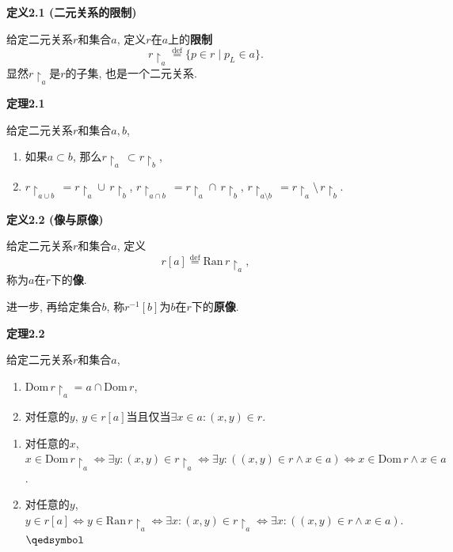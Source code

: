 \hypertarget{sec:定义2.1}{}
\noindent\textbf{定义2.1 (二元关系的限制)}

给定二元关系$r$和集合$a$, 定义$r$在$a$上的\textbf{限制}
\[
    r\!\restriction_a\overset{\mathrm{def}}{=}\{p\in r\mid p_L\in a\}.
\]
显然$r\!\restriction_a$是$r$的子集, 也是一个二元关系.

\vspace{10pt}

\hypertarget{sec:定理2.1}{}
\noindent\textbf{定理2.1}

给定二元关系$r$和集合$a,b$,
\begin{enumerate}
    \item 如果$a\subset b$, 那么$r\!\restriction_a\,\subset r\!\restriction_b$,
    \item $r\!\restriction_{a\cup b}\,=r\!\restriction_a\cup\,r\!\restriction_b$,
    $r\!\restriction_{a\cap b}\,=r\!\restriction_a\cap\,r\!\restriction_b$,
    $r\!\restriction_{a\setminus b}\,=r\!\restriction_a\setminus\,r\!\restriction_b$.
\end{enumerate}

\vspace{10pt}

\hypertarget{sec:定义2.2}{}
\noindent\textbf{定义2.2 (像与原像)}

给定二元关系$r$和集合$a$, 定义
\[
    r[a]\overset{\mathrm{def}}{=}\mathrm{Ran}\,r\!\restriction_a,
\]
称为$a$在$r$下的\textbf{像}.

进一步, 再给定集合$b$, 称$r^{-1}[b]$为$b$在$r$下的\textbf{原像}.

\vspace{10pt}

\hypertarget{sec:定理2.2}{}
\noindent\textbf{定理2.2}

给定二元关系$r$和集合$a$,
\begin{enumerate}
    \item $\mathrm{Dom}\,r\!\restriction_a=a\cap\mathrm{Dom}\,r$,
    \item 对任意的$y$, $y\in r[a]$当且仅当$\exists x\in a:(x,y)\in r$.
\end{enumerate}


\begin{enumerate}
    \item 对任意的$x$, $x\in\mathrm{Dom}\,r\!\restriction_a\iff
    \exists y:(x,y)\in r\!\restriction_a\iff
    \exists y:((x,y)\in r\land x\in a)\iff x\in\mathrm{Dom}\,r\land x\in a$.
    \item 对任意的$y$, $y\in r[a]\iff y\in\mathrm{Ran}\,r\!\restriction_a\iff
    \exists x:(x,y)\in r\!\restriction_a\iff\exists x:((x,y)\in r\land x\in a)$.
    \hfill $\qedsymbol$
\end{enumerate}

